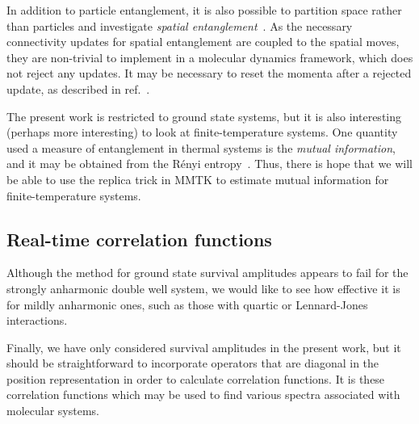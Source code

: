 In addition to particle entanglement, it is also possible to partition space rather than particles and investigate \emph{spatial entanglement}~\cite{herdman2014path}.
As the necessary connectivity updates for spatial entanglement are coupled to the spatial moves, they are non-trivial to implement in a molecular dynamics framework, which does not reject any updates.
It may be necessary to reset the momenta after a rejected update, as described in ref.~\cite[296]{tuckerman2010statistical}.

The present work is restricted to ground state systems, but it is also interesting (perhaps more interesting) to look at finite-temperature systems.
One quantity used a measure of entanglement in thermal systems is the \emph{mutual information}, and it may be obtained from the Rényi entropy~\cite{singh2011finite}.
Thus, there is hope that we will be able to use the replica trick in MMTK to estimate mutual information for finite-temperature systems.


\subsection{Real-time correlation functions}

Although the method for ground state survival amplitudes appears to fail for the strongly anharmonic double well system, we would like to see how effective it is for mildly anharmonic ones, such as those with quartic or Lennard-Jones interactions.

Finally, we have only considered survival amplitudes in the present work, but it should be straightforward to incorporate operators that are diagonal in the position representation in order to calculate correlation functions.
It is these correlation functions which may be used to find various spectra associated with molecular systems.
